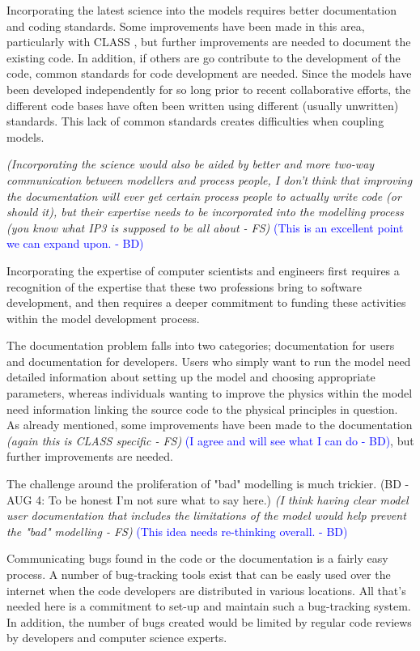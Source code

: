\documentclass[hess]{copernicus}
\begin{document}
Incorporating the latest science into the models requires better documentation and coding standards. Some improvements have been made in this area, particularly with CLASS \citep{verseghy:2009}, but further improvements are needed to document the existing code. In addition, if others are go contribute to the development of the code, common standards for code development are needed. Since the models have been developed independently for so long prior to recent collaborative efforts, the different code bases have often been written using different (usually unwritten) standards. This lack of common standards creates difficulties when coupling models.

{\em (Incorporating the science would also be aided by better and more two-way communication between modellers and process people, I don't think that improving the documentation will ever get certain process people to actually write code (or should it), but their expertise needs to be incorporated into the modelling process (you know what IP3 is supposed to be all about - FS)} \textcolor{blue}{ (This is an excellent point we can expand upon. - BD)}

Incorporating the expertise of computer scientists and engineers first requires a recognition of the expertise that these two professions bring to software development, and then requires a deeper commitment to funding these activities within the model development process.

The documentation problem falls into two categories; documentation for users and documentation for developers. Users who simply want to run the model need detailed information about setting up the model and choosing appropriate parameters, whereas individuals wanting to improve the physics within the model need information linking the source code to the physical principles in question. As already mentioned, some improvements have been made to the documentation {\em (again this is CLASS specific - FS)}\textcolor{blue}{ (I agree and will see what I can do - BD)}, but further improvements are needed.

The challenge around the proliferation of "bad" modelling is much trickier. (BD - AUG 4: To be honest I'm not sure what to say here.) {\em (I think having clear model user documentation that includes the limitations of the model would help prevent the "bad" modelling - FS)}\textcolor{blue}{ (This idea needs re-thinking overall. - BD)}

Communicating bugs found in the code or the documentation is a fairly easy process. A number of bug-tracking tools exist that can be easly used over the internet when the code developers are distributed in various locations. All that's needed here is a commitment to set-up and maintain such a bug-tracking system. In addition, the number of bugs created would be limited by regular code reviews by developers and computer science experts.
\end{document}
